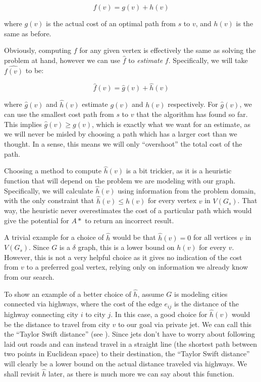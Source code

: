 \documentclass[letterpaper, 10pt]{article}
\newcommand{\keyw}[1]{\textit{\color{magenta}#1}}
\theoremstyle{definition}
\theoremstyle{Algorithm}
\begin{document}
\begin{equation}\label{eq:f}
  f(v) = g(v) + h(v)
\end{equation}


\noindent where \keyw{$g(v)$} is the actual cost of an optimal path from
$s$ to $v$, and $h(v)$ is the same as before.

Obviously, computing $f$ for any given vertex is effectively the same
as solving the problem at hand, however we can use $\hat{f}$ to
\emph{estimate} $f$. Specifically, we will take $\hat{f(v)}$ to be:

\begin{equation}\label{eq:fhat}
  \hat{f}(v) = \hat{g}(v) + \hat{h}(v)
\end{equation}

\noindent where \keyw{$\hat{g}(v)$} and \keyw{$\hat{h}(v)$} estimate
$g(v)$ and $h(v)$ respectively. For $\hat{g}(v)$, we can use
the smallest cost path from $s$ to $v$ that the algorithm has found
so far. This implies $\hat{g}(v) \geq g(v)$, which is exactly
what we want for an estimate, as we will never be misled by choosing
a path which has a larger cost than we thought. In a sense, this
means we will only ``overshoot'' the total cost of the path.

Choosing a method to compute $\hat{h}(v)$ is a bit trickier,
as it is a heuristic function that
will depend on the problem we are modeling with our graph.
Specifically, we will calculate $\hat{h}(v)$ using information
from the problem domain, with the only constraint that
$\hat{h}(v) \leq h(v)$ for every vertex $v$ in $V(G_s)$.
That way, the heuristic never overestimates the cost of
a particular path which would give the potential for $A*$ to
return an incorrect result.

A trivial example for a choice of $\hat{h}$ would be that
$\hat{h}(v) = 0$ for all vertices $v$ in $V(G_s)$. Since
$G$ is a $\delta$ graph, this is a lower bound on $h(v)$ for
every $v$. However, this is not a very helpful choice as it
gives no indication of the cost from $v$ to a preferred goal vertex,
relying only on information we already know from our search.

To show an example of a better choice of $\hat{h}$, assume
$G$ is modeling cities connected via highways, where the cost
of the edge $e_{ij}$ is the distance of the highway connecting
city $i$ to city $j$. In this case, a good choice for $\hat{h}(v)$
would be the distance to travel from city $v$ to our goal via
private jet. We can call this the ``Taylor Swift distance'' (see 
\cite{taylor}).
Since jets don't have to worry about following laid out roads and
can instead travel in a straight line (the shortest path between two points in Euclidean space)
to their destination,
the ``Taylor Swift distance'' will clearly
be a lower bound on the actual distance traveled via
highways. We shall revisit $\hat{h}$ later, as there is much more we can say
about this function. 
\end{document}
